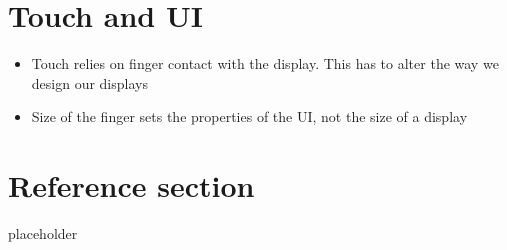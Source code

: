 \documentclass{article}
\begin{document}
\section{Touch and UI}

\begin{itemize}
  \item Touch relies on finger contact with the display. This has to alter the way we design our displays
  \item Size of the finger sets the properties of the UI, not the size of a display
\end{itemize}

\pagebreak
\section*{Reference section} \label{sec:reference}
\begin{description}
	\item[placeholder] \hfill \\
\end{description}
\end{document}
